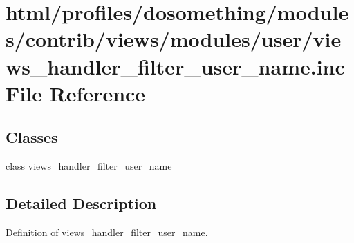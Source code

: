 \hypertarget{views__handler__filter__user__name_8inc}{
\section{html/profiles/dosomething/modules/contrib/views/modules/user/views\_\-handler\_\-filter\_\-user\_\-name.inc File Reference}
\label{views__handler__filter__user__name_8inc}
}
\subsection*{Classes}
\begin{DoxyCompactItemize}
\item 
class \hyperlink{classviews__handler__filter__user__name}{views\_\-handler\_\-filter\_\-user\_\-name}
\end{DoxyCompactItemize}


\subsection{Detailed Description}
Definition of \hyperlink{classviews__handler__filter__user__name}{views\_\-handler\_\-filter\_\-user\_\-name}. 